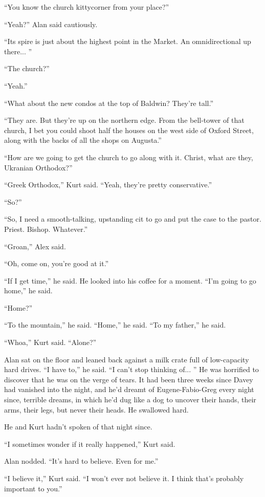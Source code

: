 \documentclass{article}
\begin{document}
``You know the church kittycorner from your place?''

``Yeah?'' Alan said cautiously.

``Its spire is just about the highest point in the Market.  An
omnidirectional up there...  ''

``The church?''

``Yeah.''

``What about the new condos at the top of Baldwin?  They're tall.''

``They are.  But they're up on the northern edge.  From the bell-tower
of that church, I bet you could shoot half the houses on the west side
of Oxford Street, along with the backs of all the shops on Augusta.''

``How are we going to get the church to go along with it.  Christ,
what are they, Ukranian Orthodox?''

``Greek Orthodox,'' Kurt said.  ``Yeah, they're pretty conservative.''

``So?''

``So, I need a smooth-talking, upstanding cit to go and put the case
to the pastor.  Priest.  Bishop.  Whatever.''

``Groan,'' Alex said.

``Oh, come on, you're good at it.''

``If I get time,'' he said.  He looked into his coffee for a moment. 
``I'm going to go home,'' he said.

``Home?''

``To the mountain,'' he said.  ``Home,'' he said.  ``To my father,''
he said.

``Whoa,'' Kurt said.  ``Alone?''

Alan sat on the floor and leaned back against a milk crate full of
low-capacity hard drives.  ``I have to,'' he said.  ``I can't stop
thinking of...  '' He was horrified to discover that he was on the
verge of tears.  It had been three weeks since Davey had vanished into
the night, and he'd dreamt of Eugene-Fabio-Greg every night since,
terrible dreams, in which he'd dug like a dog to uncover their hands,
their arms, their legs, but never their heads.  He swallowed hard.

He and Kurt hadn't spoken of that night since.

``I sometimes wonder if it really happened,'' Kurt said.

Alan nodded.  ``It's hard to believe.  Even for me.''

``I believe it,'' Kurt said.  ``I won't ever not believe it.  I think
that's probably important to you.''
\end{document}
